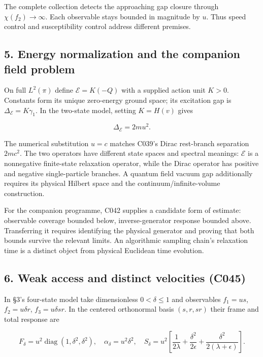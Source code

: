 \documentclass[11pt,a4paper]{article}
\begin{document}
The complete collection detects the approaching gap closure through
\(\chi(f_2)\to\infty\). Each observable stays bounded in magnitude by
\(u\). Thus speed control and susceptibility control address different
premises.

\hypertarget{energy-normalization-and-the-companion-field-problem}{%
\subsection{5. Energy normalization and the companion field
problem}\label{energy-normalization-and-the-companion-field-problem}}

On full \(L^2(\pi)\) define \(\mathcal E=K(-Q)\) with a supplied action
unit \(K>0\). Constants form its unique zero-energy ground space; its
excitation gap is \(\Delta_{\mathcal E}=K\gamma_1\). In the two-state
model, setting \(K=H(v)\) gives

\[
\Delta_{\mathcal E}=2mu^2.
\]

The numerical substitution \(u=c\) matches C039's Dirac rest-branch
separation \(2mc^2\). The two operators have different state spaces and
spectral meanings: \(\mathcal E\) is a nonnegative finite-state
relaxation operator, while the Dirac operator has positive and negative
single-particle branches. A quantum field vacuum gap additionally
requires its physical Hilbert space and the continuum/infinite-volume
construction.

For the companion programme, C042 supplies a candidate form of estimate:
observable coverage bounded below, inverse-generator response bounded
above. Transferring it requires identifying the physical generator and
proving that both bounds survive the relevant limits. An algorithmic
sampling chain's relaxation time is a distinct object from physical
Euclidean time evolution.

\hypertarget{weak-access-and-distinct-velocities-c045}{%
\subsection{6. Weak access and distinct velocities
(C045)}\label{weak-access-and-distinct-velocities-c045}}

In §3's four-state model take dimensionless \(0<\delta\le1\) and
observables \(f_1=us\), \(f_2=u\delta r\), \(f_3=u\delta sr\). In the
centered orthonormal basis \((s,r,sr)\) their frame and total response
are

\[
F_\delta=u^2\operatorname{diag}(1,\delta^2,\delta^2),\quad
\alpha_\delta=u^2\delta^2,\quad
S_\delta=u^2\left[\frac1{2\lambda}+\frac{\delta^2}{2\epsilon}
+\frac{\delta^2}{2(\lambda+\epsilon)}\right].
\]
\end{document}
